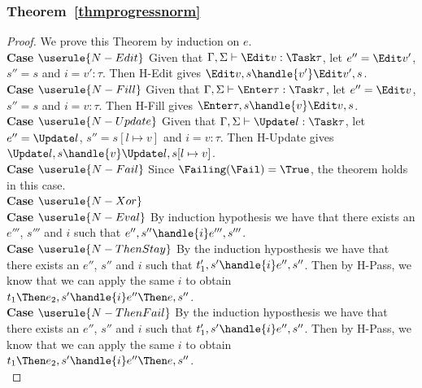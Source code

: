 \subsubsection{Theorem~\ref{thmprogressnorm}}

\begin{proof} We prove this Theorem by induction on $e$.\\

  \noindent\textbf{Case} $\userule{N-Edit}$ Given that $\Gamma,\Sigma\infers \Edit v : \Task \tau$, let $e''=\Edit v'$, $s''=s$ and $i=v':\tau$. Then H-Edit gives $\Edit v,s\handle{v'}\Edit v',s$. \\


  \noindent\textbf{Case} $\userule{N-Fill}$ Given that $\Gamma,\Sigma\infers \Enter \tau : \Task \tau$, let $e''=\Edit v$, $s''=s$ and $i=v:\tau$. Then H-Fill gives $\Enter \tau,s\handle{v}\Edit v,s$. \\

  \noindent\textbf{Case} $\userule{N-Update}$ Given that $\Gamma,\Sigma\infers \Update l : \Task \tau$, let $e''=\Update l$, $s''=s[l\mapsto v]$ and $i=v:\tau$. Then H-Update gives $\Update l ,s\handle{v}\Update l,s[l\mapsto v]$. \\

  \noindent\textbf{Case} $\userule{N-Fail}$ Since $\Failing(\Fail)=\True$, the theorem holds in this case. \\

  \noindent\textbf{Case} $\userule{N-Xor}$ \\

  \noindent\textbf{Case} $\userule{N-Eval}$ By induction hypothesis we have that there exists an $e'''$, $s'''$ and $i$ such that $e'',s''\handle{i}e''',s'''$.\\

  \noindent\textbf{Case} $\userule{N-ThenStay}$ By the induction hyposthesis we have that there exists an $e''$, $s''$ and $i$ such that $t_1',s'\handle{i}e'',s''$. Then by H-Pass, we know that we can apply the same $i$ to obtain $t_1\Then e_2,s'\handle{i} e''\Then e,s''$.\\

  \noindent\textbf{Case} $\userule{N-ThenFail}$ By the induction hyposthesis we have that there exists an $e''$, $s''$ and $i$ such that $t_1',s'\handle{i}e'',s''$. Then by H-Pass, we know that we can apply the same $i$ to obtain $t_1\Then e_2,s'\handle{i} e''\Then e,s''$.\\


\end{proof}
